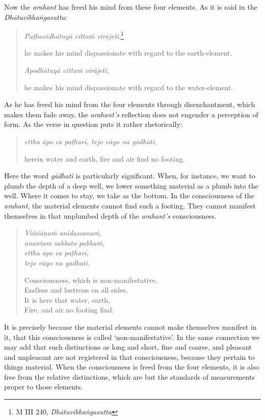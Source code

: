 Now the \emph{arahant} has freed his mind from these four elements. As it is said in the \emph{Dhātuvibhaṅgasutta}:

\clearpage

\begin{quote}
\emph{Paṭhavīdhātuyā cittaṁ virājeti},\footnote{M III 240, \emph{Dhātuvibhaṅgasutta}}

he makes his mind dispassionate with regard to the earth-element.

\emph{Āpodhātuyā cittaṁ virājeti},

he makes his mind dispassionate with regard to the water-element.
\end{quote}

As he has freed his mind from the four elements through disenchantment, which makes them fade away, the \emph{arahant's} reflection does not engender a perception of form. As the verse in question puts it rather rhetorically:

\begin{quote}
\emph{ettha āpo ca paṭhavī, tejo vāyo na gādhati,}

herein water and earth, fire and air find no footing.
\end{quote}

Here the word \emph{gādhati} is particularly significant. When, for instance, we want to plumb the depth of a deep well, we lower something material as a plumb into the well. Where it comes to stay, we take as the bottom. In the consciousness of the \emph{arahant}, the material elements cannot find such a footing. They cannot manifest themselves in that unplumbed depth of the \emph{arahant's} consciousness.

\begin{quote}
\emph{Viññāṇaṁ anidassanaṁ,}\\
\emph{anantaṁ sabbato pabhaṁ,}\\
\emph{ettha āpo ca paṭhavī,}\\
\emph{tejo vāyo na gādhati.}

Consciousness, which is non-manifestative,\\
Endless and lustrous on all sides,\\
It is here that water, earth,\\
Fire, and air no footing find.
\end{quote}

It is precisely because the material elements cannot make themselves manifest in it, that this consciousness is called `non-manifestative'. In the same connection we may add that such distinctions as long and short, fine and coarse, and pleasant and unpleasant are not registered in that consciousness, because they pertain to things material. When the consciousness is freed from the four elements, it is also free from the relative distinctions, which are but the standards of measurements proper to those elements.


